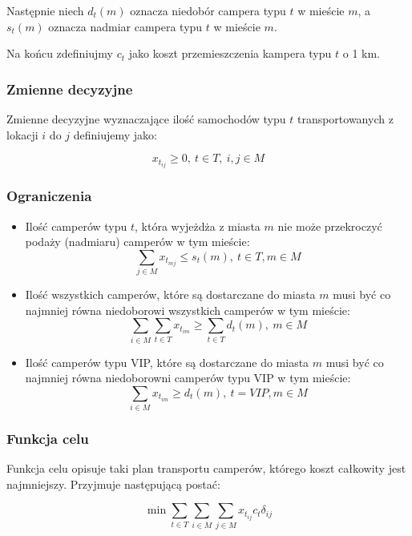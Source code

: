 \documentclass{article}
\begin{document}
        Następnie niech $d_t(m)$ oznacza niedobór campera typu $t$ w mieście $m$, a $s_t(m)$ oznacza nadmiar campera typu $t$ w mieście $m$.

        Na końcu zdefiniujmy $c_t$ jako koszt przemieszczenia kampera typu $t$ o 1 km.

    \subsubsection{Zmienne decyzyjne}

        Zmienne decyzyjne wyznaczające ilość samochodów typu $t$ transportowanych z lokacji $i$ do $j$ definiujemy jako:

        $$x_{t_{ij}} \geq 0, \ t \in T, \ i,j \in M$$

    \subsubsection{Ograniczenia}

        \begin{itemize}
            \item Ilość camperów typu $t$, która wyjeżdża z miasta $m$ nie może przekroczyć podaży (nadmiaru) camperów w tym mieście:
                $$\sum_{j \in M} x_{t_{mj}} \leq s_t(m), \ t \in T, m \in M$$

            \item Ilość wszystkich camperów, które są dostarczane do miasta $m$ musi być co najmniej równa niedoborowi wszystkich camperów w tym mieście:
                $$\sum_{i \in M}\sum_{t \in T} x_{t_{im}} \geq \sum_{t \in T}d_t(m), \ m \in M$$

            \item Ilość camperów typu VIP, które są dostarczane do miasta $m$ musi być co najmniej równa niedoborowni camperów typu VIP w tym mieście:
                $$\sum_{i \in M} x_{t_{im}} \geq d_{t}(m), \ t = VIP, m \in M$$
        \end{itemize}

    \subsubsection{Funkcja celu}

        Funkcja celu opisuje taki plan transportu camperów, którego koszt całkowity jest najmniejszy. Przyjmuje następującą postać:

        $$\min \sum_{t \in T} \sum_{i \in M} \sum_{j \in M} x_{t_{ij}} c_t \delta_{ij}$$
\end{document}
